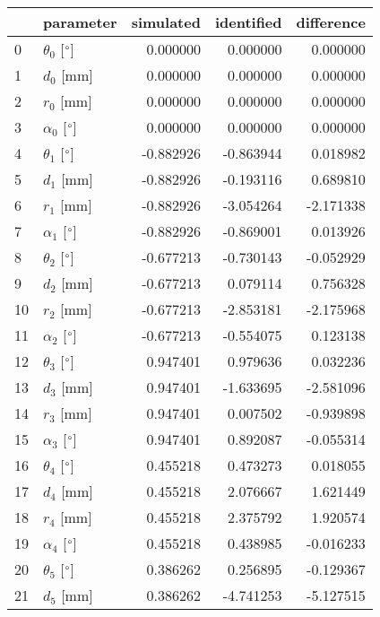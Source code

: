 \documentclass{standalone}%
\begin{document}
%
\normalsize%
\begin{tabular}{llrrr}
\toprule
{} &                 parameter & simulated & identified & difference \\
\midrule
0  &  $\theta_{0}$ [$\degree$] &  0.000000 &   0.000000 &   0.000000 \\
1  &              $d_{0}$ [mm] &  0.000000 &   0.000000 &   0.000000 \\
2  &              $r_{0}$ [mm] &  0.000000 &   0.000000 &   0.000000 \\
3  &  $\alpha_{0}$ [$\degree$] &  0.000000 &   0.000000 &   0.000000 \\
4  &  $\theta_{1}$ [$\degree$] & -0.882926 &  -0.863944 &   0.018982 \\
5  &              $d_{1}$ [mm] & -0.882926 &  -0.193116 &   0.689810 \\
6  &              $r_{1}$ [mm] & -0.882926 &  -3.054264 &  -2.171338 \\
7  &  $\alpha_{1}$ [$\degree$] & -0.882926 &  -0.869001 &   0.013926 \\
8  &  $\theta_{2}$ [$\degree$] & -0.677213 &  -0.730143 &  -0.052929 \\
9  &              $d_{2}$ [mm] & -0.677213 &   0.079114 &   0.756328 \\
10 &              $r_{2}$ [mm] & -0.677213 &  -2.853181 &  -2.175968 \\
11 &  $\alpha_{2}$ [$\degree$] & -0.677213 &  -0.554075 &   0.123138 \\
12 &  $\theta_{3}$ [$\degree$] &  0.947401 &   0.979636 &   0.032236 \\
13 &              $d_{3}$ [mm] &  0.947401 &  -1.633695 &  -2.581096 \\
14 &              $r_{3}$ [mm] &  0.947401 &   0.007502 &  -0.939898 \\
15 &  $\alpha_{3}$ [$\degree$] &  0.947401 &   0.892087 &  -0.055314 \\
16 &  $\theta_{4}$ [$\degree$] &  0.455218 &   0.473273 &   0.018055 \\
17 &              $d_{4}$ [mm] &  0.455218 &   2.076667 &   1.621449 \\
18 &              $r_{4}$ [mm] &  0.455218 &   2.375792 &   1.920574 \\
19 &  $\alpha_{4}$ [$\degree$] &  0.455218 &   0.438985 &  -0.016233 \\
20 &  $\theta_{5}$ [$\degree$] &  0.386262 &   0.256895 &  -0.129367 \\
21 &              $d_{5}$ [mm] &  0.386262 &  -4.741253 &  -5.127515 \\

\end{tabular}
\end{document}
